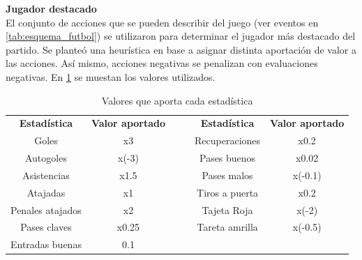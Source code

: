     \textbf{Jugador destacado}\\

    El conjunto de acciones que se pueden describir del juego (ver eventos en \ref{tab:esquema_futbol}) se utilizaron para 
determinar el jugador más destacado del partido. Se planteó una heurística en base a asignar distinta aportación de valor a 
las acciones. Así mismo, acciones negativas se penalizan con evaluaciones negativas. En \ref{tab:tablaheuristica} se muestan los valores utilizados.



\begin{table}[]
    \begin{center}
        

    \begin{tabular}{|c|c|llcc}
    \cline{1-2} \cline{5-6}
    \textbf{Estadística} &
      \textbf{Valor aportado} &
      \multicolumn{2}{l|}{\multirow{4}{*}{}} &
      \multicolumn{1}{c|}{\textbf{Estadística}} &
      \multicolumn{1}{c|}{\textbf{Valor aportado}} \\ \cline{1-2} \cline{5-6} 
    Goles            & x3    & \multicolumn{2}{l|}{}    & \multicolumn{1}{c|}{Recuperaciones} & \multicolumn{1}{c|}{x0.2}    \\ \cline{1-2} \cline{5-6} 
    Autogoles        & x(-3) & \multicolumn{2}{l|}{}    & \multicolumn{1}{c|}{Pases buenos}   & \multicolumn{1}{c|}{x0.02}   \\ \cline{1-2} \cline{5-6} 
    Asistencias      & x1.5  & \multicolumn{2}{l|}{}    & \multicolumn{1}{c|}{Pases malos}    & \multicolumn{1}{c|}{x(-0.1)} \\ \cline{1-2} \cline{5-6} 
    Atajadas         & x1    &  & \multicolumn{1}{l|}{} & \multicolumn{1}{c|}{Tiros a puerta} & \multicolumn{1}{c|}{x0.2}    \\ \cline{1-2} \cline{5-6} 
    Penales atajados & x2    &  & \multicolumn{1}{l|}{} & \multicolumn{1}{c|}{Tajeta Roja}    & \multicolumn{1}{c|}{x(-2)}   \\ \cline{1-2} \cline{5-6} 
    Pases claves     & x0.25 &  & \multicolumn{1}{l|}{} & \multicolumn{1}{c|}{Tareta amrilla} & \multicolumn{1}{c|}{x(-0.5)} \\ \cline{1-2} \cline{5-6} 
    Entradas buenas  & 0.1   &  &                       &                                     &                              \\ \cline{1-2}
    \end{tabular}
    \end{center}
    \caption{Valores que aporta cada estadística}
    \label{tab:tablaheuristica}
    \end{table}

